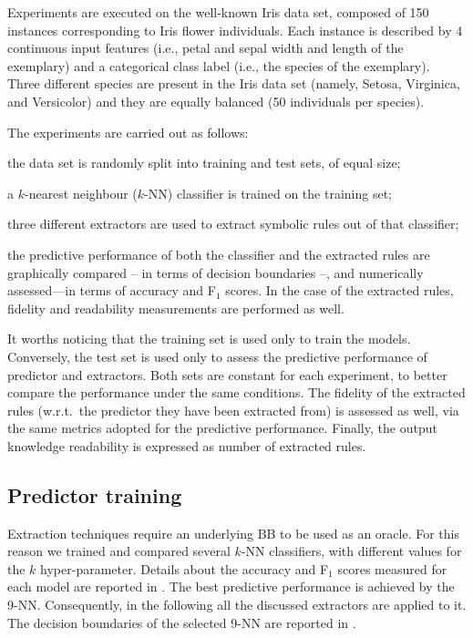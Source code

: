 \documentclass[
]{ceurart}
\begin{document}
Experiments are executed on the well-known Iris data set\footnotemark, composed of 150 instances corresponding to Iris flower individuals.
%
%
Each instance is described by 4 continuous input features (i.e., petal and sepal width and length of the exemplary) and a categorical class label (i.e., the species of the exemplary).
%
Three different species are present in the Iris data set (namely, Setosa, Virginica, and Versicolor) and they are equally balanced (50 individuals per species).

The experiments are carried out as follows:
%
\begin{inlinelist}
	\item the data set is randomly split into training and test sets, of equal size;
	\item a $k$-nearest neighbour ($k$-NN) classifier is trained on the training set;
	\item three different extractors are used to extract symbolic rules out of that classifier;
	\item the predictive performance of both the classifier and the extracted rules are graphically compared -- in terms of decision boundaries --, and numerically assessed---in terms of accuracy and F$_1$ scores. In the case of the extracted rules, fidelity and readability measurements are performed as well.
\end{inlinelist}
%
It worths noticing that the training set is used only to train the models.
%
Conversely, the test set is used only to assess the predictive performance of predictor and extractors.
%
Both sets are constant for each experiment, to better compare the performance under the same conditions.
%
The fidelity of the extracted rules (w.r.t.\ the predictor they have been extracted from) is assessed as well, via the same metrics adopted for the predictive performance.
%
Finally, the output knowledge readability is expressed as number of extracted rules.

\subsection{Predictor training}

Extraction techniques require an underlying BB to be used as an oracle.
%
For this reason we trained and compared several $k$-NN classifiers, with different values for the $k$ hyper-parameter.
%
Details about the accuracy and F$_1$ scores measured for each model are reported in .
%
The best predictive performance is achieved by the 9-NN.
%
Consequently, in the following all the discussed extractors are applied to it.
%
The decision boundaries of the selected 9-NN are reported in .
\end{document}
